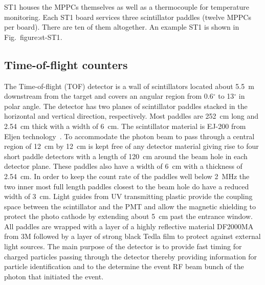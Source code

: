 ST1 houses the MPPCs themselves as well as a thermocouple for
temperature monitoring. Each ST1 board services three scintillator
paddles (twelve MPPCs per board). There are ten of them altogether. An
example ST1 is shown in Fig.~{figure:st-ST1}.

\subsection[Time-of-flight counters (Beni)]{Time-of-flight counters \label{sec:tof}}
The Time-of-flight (TOF) detector is a wall of scintillators located about 5.5~m downstream from the target and covers 
an angular region from 0.6$^{\circ}$ to 13$^{\circ}$ in polar angle. The detector has two planes of
scintillator paddles stacked in the horizontal and vertical direction, respectively. Most paddles are 252~cm long and 2.54~cm
thick with a width of 6~cm. 
The scintillator material is EJ-200 from Eljen technology~\cite{EljenTech}.
To accommodate the photon beam to pass through a central region of 12~cm by 12~cm is kept
free of any detector material giving rise to four short paddle detectors with a length of 120~cm around the beam hole
in each detector plane. These paddles also have a width of 6~cm with a thickness of 2.54~cm. In order to keep the
count rate of the paddles well below 2~MHz the two inner most full length paddles closest to the beam hole do have a reduced width of 3~cm.
Light guides from UV transmitting plastic provide the coupling space between the scintillator and the PMT and allow the 
magnetic shielding to protect the photo cathode by extending about 5~cm past the entrance window. All paddles are wrapped
with a layer of a highly reflective material DF2000MA from 3M followed by a layer of strong black Tedla film to
protect against external light sources. 
The main purpose of the detector is to provide fast timing for charged particles passing through the detector thereby providing information for particle identification and to the determine the event RF beam bunch of the photon that initiated the event.

